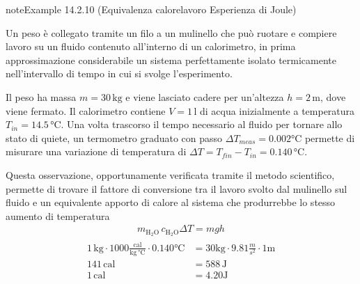 \documentclass[letterpaper,10pt,italian]{jupyterBook}
\begin{document}
\begin{sphinxadmonition}{note}{Example 14.2.10 (Equivalenza calore\sphinxhyphen{}lavoro \sphinxhyphen{} Esperienza di Joule)}



\sphinxAtStartPar
Un peso è collegato tramite un filo a un mulinello che può ruotare e compiere lavoro su un fluido contenuto all’interno di un calorimetro, in prima approssimazione considerabile un sistema perfettamente isolato termicamente nell’intervallo di tempo in cui si svolge l’esperimento.

\sphinxAtStartPar
Il peso ha massa \(m = 30 \, \text{kg}\) e viene lasciato cadere per un’altezza \(h = 2 \, \text{m}\), dove viene fermato. Il calorimetro contiene \(V = 1 \, \text{l}\) di acqua inizialmente a temperatura \(T_{in} = 14.5 \, \text{°C}\). Una volta trascorso il tempo necessario al fluido per tornare allo stato di quiete, un termometro graduato con passo \(\Delta T_{meas} = 0.002 \text{°C}\) permette di misurare una variazione di temperatura di \(\Delta T = T_{fin} - T_{in} = 0.140 \, \text{°C}\).

\sphinxAtStartPar
Questa osservazione, opportunamente verificata tramite il metodo scientifico, permette di trovare il fattore di conversione tra il lavoro svolto dal mulinello sul fluido e un equivalente apporto di calore al sistema che produrrebbe lo stesso aumento di temperatura
\begin{equation*}
\begin{split}m_{\text{H$_2$O}} \, c_{\text{H$_2$O}} \Delta T = m g h\end{split}
\end{equation*}\begin{equation*}
\begin{split}\begin{aligned}
  1 \, \text{kg} \cdot 1000 \frac{\text{cal}}{\text{kg} \, \text{°C}} \cdot 0.140 \text{°C} & = 30 \text{kg} \cdot 9.81 \frac{m}{s^2} \cdot 1 \text{m} \\
  141 \, \text{cal} & = 588 \, \text{J} \\
  1 \, \text{cal} & = 4.20 \text{J}
\end{aligned}\end{split}
\end{equation*}\end{sphinxadmonition}
\label{ch/thermodynamics/foundation-experiments:thermodynamics:history:heat-work:second}
\end{document}
